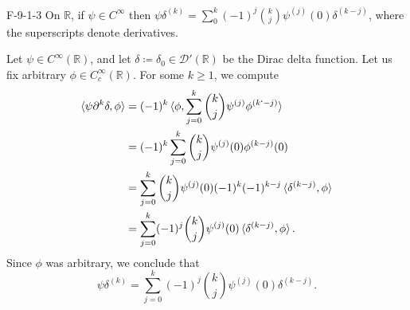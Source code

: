 \documentclass{article}
\begin{document}
	\begin{prb}{F-9-1-3}
		On $\mathbb{R}$, if $\psi \in C^{\infty}$ then $\psi \delta^{(k)} = \sum_{0}^{k}(-1)^{j}\binom{k}{j}\psi^{(j)}(0)\delta^{(k - j)}$, where the superscripts denote derivatives. 
	\end{prb}
	Let $\psi \in C^{\infty}(\mathbb{R})$, and let $\delta \coloneqq \delta_{0} \in \mathcal{D}'(\mathbb{R})$ be the Dirac delta function. Let us fix arbitrary $\phi \in C_{c}^{\infty}(\mathbb{R})$. For some $k \geq 1$, we compute 
	\begin{align*}
		\begin{split}
			\braket{\psi \partial^{k}\delta,\phi} 
			&= (-1)^{k}\braket{\phi, \sum_{j = 0}^{k}\binom{k}{j}\psi^{(j)}\phi^{(k`-j)}} \\
			&= (-1)^{k}\sum_{j = 0}^{k}\binom{k}{j}\psi^{(j)}(0)\phi^{(k-j)}(0) \\
			&= \sum_{j = 0}^{k}\binom{k}{j}\psi^{(j)}(0)(-1)^{k}(-1)^{k -j}\braket{\delta^{(k-j)},\phi} \\
			&= \sum_{j = 0}^{k}(-1)^{j}\binom{k}{j}\psi^{(j)}(0)\braket{\delta^{(k-j)},\phi}. 
		\end{split}
	\end{align*}
	Since $\phi$ was arbitrary, we conclude that 
	\begin{equation*}
		\psi \delta^{(k)} = \sum_{j = 0}^{k}(-1)^{j}\binom{k}{j}\psi^{(j)}(0)\delta^{(k - j)}.
	\end{equation*}
	
\end{document}
